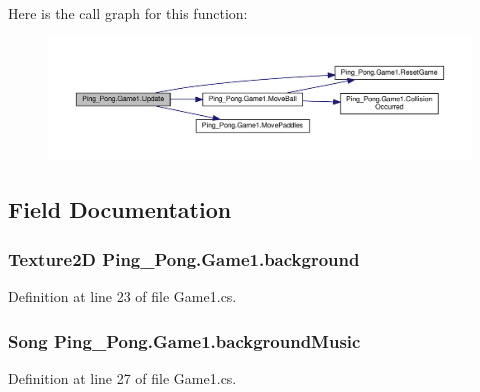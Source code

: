 Here is the call graph for this function\-:\nopagebreak
\begin{figure}[H]
\begin{center}
\leavevmode
\includegraphics[width=350pt]{class_ping___pong_1_1_game1_adcf5d3a66fa192e3318b14188dd0c34a_cgraph}
\end{center}
\end{figure}




\subsection{Field Documentation}
\hypertarget{class_ping___pong_1_1_game1_ae0f525562a3eb615b556f4a9a1eda3e7}{
\subsubsection[{background}]{\setlength{\rightskip}{0pt plus 5cm}Texture2\-D Ping\-\_\-\-Pong.\-Game1.\-background\hspace{0.3cm}{\ttfamily [private]}}}\label{class_ping___pong_1_1_game1_ae0f525562a3eb615b556f4a9a1eda3e7}


Definition at line 23 of file Game1.\-cs.

\hypertarget{class_ping___pong_1_1_game1_ab6439b5c8bcfb4ba77f2a62ab4c73213}{
\subsubsection[{background\-Music}]{\setlength{\rightskip}{0pt plus 5cm}Song Ping\-\_\-\-Pong.\-Game1.\-background\-Music\hspace{0.3cm}{\ttfamily [private]}}}\label{class_ping___pong_1_1_game1_ab6439b5c8bcfb4ba77f2a62ab4c73213}


Definition at line 27 of file Game1.\-cs.

